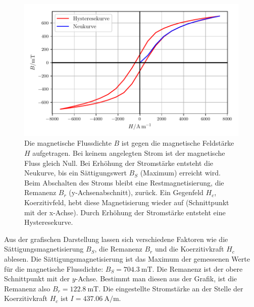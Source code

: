 \begin{figure}
    \centering
    \includegraphics{build/plotc.pdf}
    \caption{Die magnetische Flussdichte $B$ ist gegen die magnetische Feldstärke $H$
    aufgetragen. Bei keinem angelegten Strom ist der magnetische Fluss
    gleich Null. Bei Erhöhung der Stromstärke entsteht die Neukurve, bis
    ein Sättigungswert $B_{S}$ (Maximum) erreicht wird. Beim Abschalten des Stroms
    bleibt eine Restmagnetisierung, die Remanenz $B_{r}$ (y-Achsenabschnitt),
    zurück. Ein Gegenfeld $H_{c}$, Koerzitivfeld, hebt diese Magnetisierung wieder
    auf (Schnittpunkt mit der x-Achse). Durch Erhöhung der Stromstärke entsteht
    eine Hysteresekurve.}
    \label{plotc}
\end{figure}

\noindent Aus der grafischen Darstellung lassen sich verschiedene Faktoren
wie die Sättigungsmagnetisierung $B_{S}$, die Remanenz $B_{r}$ und die
Koerzitivkraft $H_{c}$ ablesen.
Die Sättigungsmagnetisierung ist das Maximum der gemessenen Werte für
die magnetische Flussdichte: $B_{S} = \SI{704.3}{\milli\tesla}$.
Die Remanenz ist der obere Schnittpunkt mit der $y$-Achse. %
Bestimmt man diesen aus der Grafik, ist die Remanenz also
$B_{r} = \SI{122.8}{\milli\tesla}$.
Die eingestellte Stromstärke an der Stelle der Koerzitivkraft $H_{c}$ ist
$I = \SI{437.06}{\ampere\per\meter}$. %

